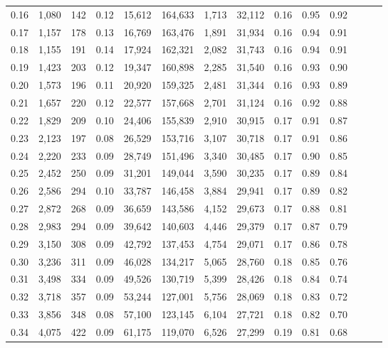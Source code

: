 \begin{tabular}{rrrrrrrrrrrrrr}
0.16 &  1,080 &  142 &  0.12 &   15,612 &  164,633 &   1,713 &  32,112 &  0.16 &  0.95 &      0.92 \\
0.17 &  1,157 &  178 &  0.13 &   16,769 &  163,476 &   1,891 &  31,934 &  0.16 &  0.94 &      0.91 \\
0.18 &  1,155 &  191 &  0.14 &   17,924 &  162,321 &   2,082 &  31,743 &  0.16 &  0.94 &      0.91 \\
0.19 &  1,423 &  203 &  0.12 &   19,347 &  160,898 &   2,285 &  31,540 &  0.16 &  0.93 &      0.90 \\
0.20 &  1,573 &  196 &  0.11 &   20,920 &  159,325 &   2,481 &  31,344 &  0.16 &  0.93 &      0.89 \\
0.21 &  1,657 &  220 &  0.12 &   22,577 &  157,668 &   2,701 &  31,124 &  0.16 &  0.92 &      0.88 \\
0.22 &  1,829 &  209 &  0.10 &   24,406 &  155,839 &   2,910 &  30,915 &  0.17 &  0.91 &      0.87 \\
0.23 &  2,123 &  197 &  0.08 &   26,529 &  153,716 &   3,107 &  30,718 &  0.17 &  0.91 &      0.86 \\
0.24 &  2,220 &  233 &  0.09 &   28,749 &  151,496 &   3,340 &  30,485 &  0.17 &  0.90 &      0.85 \\
0.25 &  2,452 &  250 &  0.09 &   31,201 &  149,044 &   3,590 &  30,235 &  0.17 &  0.89 &      0.84 \\
0.26 &  2,586 &  294 &  0.10 &   33,787 &  146,458 &   3,884 &  29,941 &  0.17 &  0.89 &      0.82 \\
0.27 &  2,872 &  268 &  0.09 &   36,659 &  143,586 &   4,152 &  29,673 &  0.17 &  0.88 &      0.81 \\
0.28 &  2,983 &  294 &  0.09 &   39,642 &  140,603 &   4,446 &  29,379 &  0.17 &  0.87 &      0.79 \\
0.29 &  3,150 &  308 &  0.09 &   42,792 &  137,453 &   4,754 &  29,071 &  0.17 &  0.86 &      0.78 \\
0.30 &  3,236 &  311 &  0.09 &   46,028 &  134,217 &   5,065 &  28,760 &  0.18 &  0.85 &      0.76 \\
0.31 &  3,498 &  334 &  0.09 &   49,526 &  130,719 &   5,399 &  28,426 &  0.18 &  0.84 &      0.74 \\
0.32 &  3,718 &  357 &  0.09 &   53,244 &  127,001 &   5,756 &  28,069 &  0.18 &  0.83 &      0.72 \\
0.33 &  3,856 &  348 &  0.08 &   57,100 &  123,145 &   6,104 &  27,721 &  0.18 &  0.82 &      0.70 \\
0.34 &  4,075 &  422 &  0.09 &   61,175 &  119,070 &   6,526 &  27,299 &  0.19 &  0.81 &      0.68 \\

\end{tabular}
